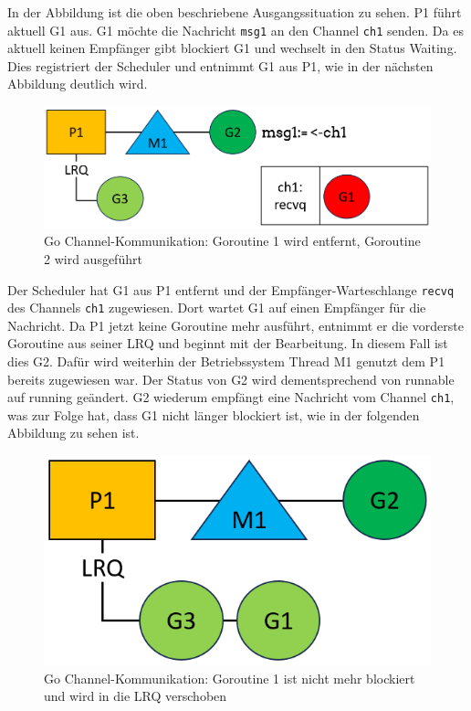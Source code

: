 \documentclass[fontsize=12pt,paper=a4,twoside=semi,parskip=half-,headsepline,headinclude]{scrreprt}
\begin{document}
In der Abbildung ist die oben beschriebene Ausgangssituation zu sehen. P1 führt aktuell G1 aus. G1 möchte die Nachricht \texttt{msg1} an den Channel \texttt{ch1} senden. Da es aktuell keinen Empfänger gibt blockiert G1 und wechselt in den Status Waiting. Dies registriert der Scheduler und entnimmt G1 aus P1, wie in der nächsten Abbildung deutlich wird.

\begin{figure}[H]
	\centering
	\includegraphics[scale=0.5]{figures/GoroutineChannel2.png}
	\caption{Go Channel-Kommunikation: Goroutine 1 wird entfernt, Goroutine 2 wird ausgeführt}
	\label{fig:GoroutineChannel2}
\end{figure}

Der Scheduler hat G1 aus P1 entfernt und der Empfänger-Warteschlange \texttt{recvq} des Channels \texttt{ch1} zugewiesen. Dort wartet G1 auf einen Empfänger für die Nachricht. Da P1 jetzt keine Goroutine mehr ausführt, entnimmt er die vorderste Goroutine aus seiner LRQ und beginnt mit der Bearbeitung. In diesem Fall ist dies G2. Dafür wird weiterhin der Betriebssystem Thread M1 genutzt dem P1 bereits zugewiesen war. Der Status von G2 wird dementsprechend von runnable auf running geändert. G2 wiederum empfängt eine Nachricht vom Channel \texttt{ch1}, was zur Folge hat, dass G1 nicht länger blockiert ist, wie in der folgenden Abbildung zu sehen ist.

\begin{figure}[H]
	\centering
	\includegraphics[scale=0.5]{figures/GoroutineChannel3.png}
	\caption{Go Channel-Kommunikation: Goroutine 1 ist nicht mehr blockiert und wird in die LRQ verschoben}
	\label{fig:GoroutineChannel3}
\end{figure}
\end{document}
